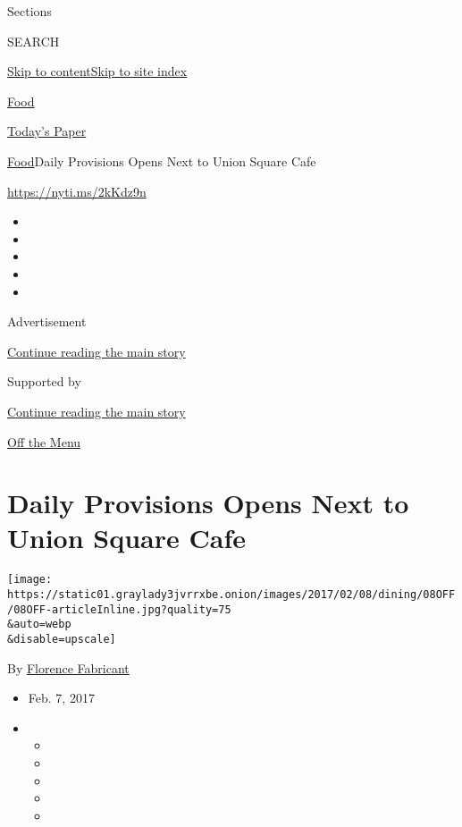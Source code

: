 Sections

SEARCH

\protect\hyperlink{site-content}{Skip to
content}\protect\hyperlink{site-index}{Skip to site index}

\href{https://www.nytimes3xbfgragh.onion/section/food}{Food}

\href{https://myaccount.nytimes3xbfgragh.onion/auth/login?response_type=cookie\&client_id=vi}{}

\href{https://www.nytimes3xbfgragh.onion/section/todayspaper}{Today's
Paper}

\href{/section/food}{Food}\textbar{}Daily Provisions Opens Next to Union
Square Cafe

\url{https://nyti.ms/2kKdz9n}

\begin{itemize}
\item
\item
\item
\item
\item
\end{itemize}

Advertisement

\protect\hyperlink{after-top}{Continue reading the main story}

Supported by

\protect\hyperlink{after-sponsor}{Continue reading the main story}

\href{/column/off-the-menu}{Off the Menu}

\hypertarget{daily-provisions-opens-next-to-union-square-cafe}{%
\section{Daily Provisions Opens Next to Union Square
Cafe}\label{daily-provisions-opens-next-to-union-square-cafe}}

\texttt{[image: https://static01.graylady3jvrrxbe.onion/images/2017/02/08/dining/08OFF/08OFF-articleInline.jpg?quality=75\\\&auto=webp\\\&disable=upscale]}

By
\href{http://www.nytimes3xbfgragh.onion/by/florence-fabricant}{Florence
Fabricant}

\begin{itemize}
\item
  Feb. 7, 2017
\item
  \begin{itemize}
  \item
  \item
  \item
  \item
  \item
  \end{itemize}
\end{itemize}

